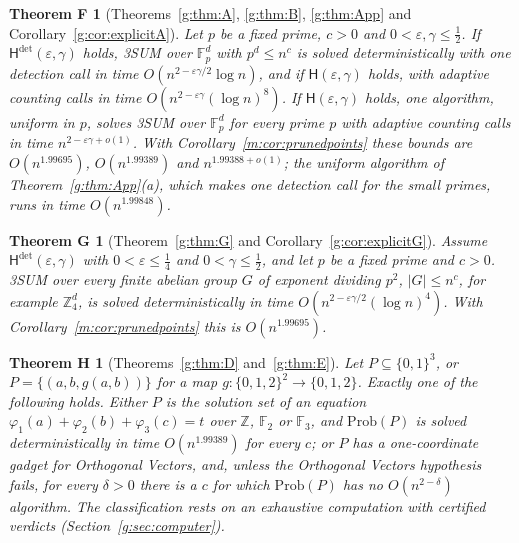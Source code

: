 \documentclass[11pt]{article}
\newtheorem*{theoremF}{Theorem F}
\newtheorem*{theoremG}{Theorem G}
\newtheorem*{theoremH}{Theorem H}
\theoremstyle{definition}
\theoremstyle{remark}
\newcommand{\Z}{\mathbb{Z}}
\newcommand{\F}{\mathbb{F}_2}
\newcommand{\Fp}{\mathbb{F}_p}
\newcommand{\Prob}{\mathrm{Prob}}
\newcommand{\Hyp}{\mathsf{H}}
\newcommand{\ExpThreeSumBest}{1.99388}%
\newcommand{\ExpBestUp}{1.99389}%
\newcommand{\ExpHalfBestUp}{1.99695}%
\newcommand{\ExpQuarterBestUp}{1.99848}%
\begin{document}
\label{m:introF}\begin{theoremF}[Theorems~\ref{g:thm:A}, \ref{g:thm:B}, \ref{g:thm:App} and Corollary~\ref{g:cor:explicitA}]
Let $p$ be a fixed prime, $c>0$ and $0<\varepsilon,\gamma\le\frac12$. If $\Hyp^{\det}(\varepsilon,\gamma)$ holds, 3SUM over $\Fp^d$ with $p^d\le n^c$ is solved deterministically with one detection call in time $O(n^{2-\varepsilon\gamma/2}\log n)$, and if $\Hyp(\varepsilon,\gamma)$ holds, with adaptive counting calls in time $O(n^{2-\varepsilon\gamma}(\log n)^8)$. If $\Hyp(\varepsilon,\gamma)$ holds, one algorithm, uniform in $p$, solves 3SUM over $\Fp^d$ for every prime $p$ with adaptive counting calls in time $n^{2-\varepsilon\gamma+o(1)}$. With Corollary~\ref{m:cor:prunedpoints} these bounds are $O(n^{\ExpHalfBestUp})$, $O(n^{\ExpBestUp})$ and $n^{\ExpThreeSumBest+o(1)}$; the uniform algorithm of Theorem~\ref{g:thm:App}(a), which makes one detection call for the small primes, runs in time $O(n^{\ExpQuarterBestUp})$.
\end{theoremF}

\label{m:introG}\begin{theoremG}[Theorem~\ref{g:thm:G} and Corollary~\ref{g:cor:explicitG}]
Assume $\Hyp^{\det}(\varepsilon,\gamma)$ with $0<\varepsilon\le\frac14$ and $0<\gamma\le\frac12$, and let $p$ be a fixed prime and $c>0$. 3SUM over every finite abelian group $G$ of exponent dividing $p^2$, $|G|\le n^c$, for example $\Z_4^d$, is solved deterministically in time $O(n^{2-\varepsilon\gamma/2}(\log n)^4)$. With Corollary~\ref{m:cor:prunedpoints} this is $O(n^{\ExpHalfBestUp})$.
\end{theoremG}

\label{m:introH}\begin{theoremH}[Theorems~\ref{g:thm:D} and~\ref{g:thm:E}]
Let $P\subseteq\{0,1\}^3$, or $P=\{(a,b,g(a,b))\}$ for a map $g\colon\{0,1,2\}^2\to\{0,1,2\}$. Exactly one of the following holds. Either $P$ is the solution set of an equation $\varphi_1(a)+\varphi_2(b)+\varphi_3(c)=t$ over $\Z$, $\F$ or $\mathbb F_3$, and $\Prob(P)$ is solved deterministically in time $O(n^{\ExpBestUp})$ for every $c$; or $P$ has a one-coordinate gadget for Orthogonal Vectors, and, unless the Orthogonal Vectors hypothesis fails, for every $\delta>0$ there is a $c$ for which $\Prob(P)$ has no $O(n^{2-\delta})$ algorithm. The classification rests on an exhaustive computation with certified verdicts (Section~\ref{g:sec:computer}).
\end{theoremH}
\end{document}
